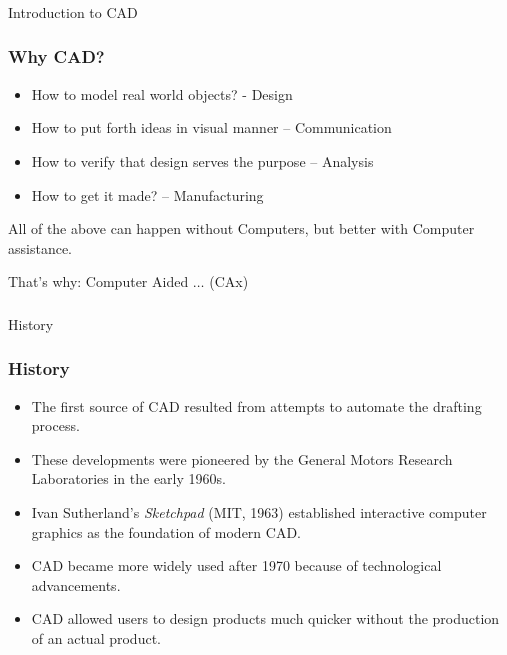 \begin{frame}[fragile]\frametitle{}
\begin{center}
{\Large Introduction to CAD}
\end{center}
\end{frame}


\begin{frame}[fragile]\frametitle{Why CAD?}
\begin{itemize}
\item How to model real world objects? - Design
\item How to put forth ideas in visual manner – Communication
\item How to verify that design serves the purpose – Analysis
\item How to get it made? – Manufacturing
\end{itemize}

All of the above can happen without Computers, but better with Computer assistance.

That's why: Computer Aided $\ldots$ (CAx)

\end{frame}

\begin{frame}[fragile]\frametitle{}
\begin{center}
{\Large History}
\end{center}
\end{frame}

\begin{frame}[fragile]\frametitle{History}
\begin{itemize}
\item The first source of CAD resulted from attempts to automate the drafting process.
\item These developments were pioneered by the General Motors Research Laboratories in the early 1960s.
\item Ivan Sutherland's \textit{Sketchpad} (MIT, 1963) established interactive computer graphics as the foundation of modern CAD.
\item CAD became more widely used after 1970 because of technological advancements.
\item CAD allowed users to design products much quicker without the production of an actual product.

\end{itemize}

\end{frame}

